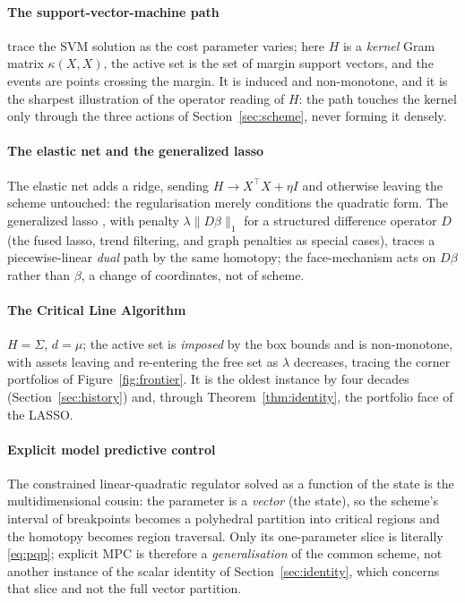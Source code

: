 \documentclass[sts]{imsart}
\newcommand{\Sig}{\Sigma}
\newcommand{\trans}{^{\top}}
\theoremstyle{plain}
\theoremstyle{definition}
\begin{document}
\paragraph{The support-vector-machine path} \citet{hastie2004svm} trace the SVM
solution as the cost parameter varies; here $H$ is a \emph{kernel} Gram matrix
$\kappa(X,X)$, the active set is the set of margin support vectors, and the events are
points crossing the margin. It is induced and non-monotone, and it is the sharpest
illustration of the operator reading of $H$: the path touches the kernel only through
the three actions of Section~\ref{sec:scheme}, never forming it densely.

\paragraph{The elastic net and the generalized lasso} The elastic net
\citep{zou2005} adds a ridge, sending $H\to X\trans X + \eta I$ and otherwise leaving
the scheme untouched: the regularisation merely conditions the quadratic form. The
generalized lasso \citep{tibshirani2011}, with penalty $\lambda\|D\beta\|_1$ for a
structured difference operator $D$ (the fused lasso, trend filtering, and graph
penalties as special cases), traces a piecewise-linear \emph{dual} path by the same
homotopy; the face-mechanism acts on $D\beta$ rather than $\beta$, a change of
coordinates, not of scheme.

\paragraph{The Critical Line Algorithm} $H=\Sig$, $d=\mu$; the active set is
\emph{imposed} by the box bounds and is non-monotone, with assets leaving and
re-entering the free set as $\lambda$ decreases, tracing the corner portfolios of
Figure~\ref{fig:frontier}. It is the oldest instance by four decades
(Section~\ref{sec:history}) and, through Theorem~\ref{thm:identity}, the portfolio
face of the LASSO.

\paragraph{Explicit model predictive control} The constrained linear-quadratic
regulator solved as a function of the state \citep{bemporad2002, tondel2003} is the
multidimensional cousin: the parameter is a \emph{vector} (the state), so the scheme's
interval of breakpoints becomes a polyhedral partition into critical regions and the
homotopy becomes region traversal. Only its one-parameter slice is literally
\eqref{eq:pqp}; explicit MPC is therefore a \emph{generalisation} of the common
scheme, not another instance of the scalar identity of Section~\ref{sec:identity},
which concerns that slice and not the full vector partition.
\end{document}
